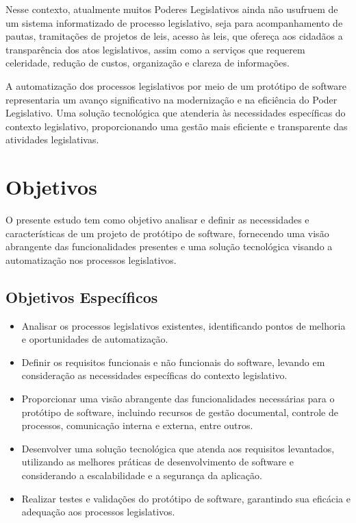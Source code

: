 \documentclass[12pt]{article}
\begin{document}
Nesse contexto, atualmente muitos Poderes Legislativos ainda não usufruem de um sistema informatizado de processo legislativo, seja para acompanhamento de pautas, tramitações de projetos de leis, acesso às leis, que ofereça aos cidadãos a transparência dos atos legislativos, assim como a serviços que requerem celeridade, redução de custos, organização e clareza de informações.

A automatização dos processos legislativos por meio de um protótipo de software representaria um avanço significativo na modernização e na eficiência do Poder Legislativo. Uma solução tecnológica que atenderia às necessidades específicas do contexto legislativo, proporcionando uma gestão mais eficiente e transparente das atividades legislativas.

\section{Objetivos}

O presente estudo tem como objetivo analisar e definir as necessidades e características de um projeto de protótipo de software, fornecendo uma visão abrangente das funcionalidades presentes e uma solução tecnológica visando a automatização nos processos legislativos. 

\subsection{Objetivos Específicos}

\begin{itemize}
	\item Analisar os processos legislativos existentes, identificando pontos de melhoria e oportunidades de automatização.
	
	\item Definir os requisitos funcionais e não funcionais do software, levando em consideração as necessidades específicas do contexto legislativo.
	
	\item Proporcionar uma visão abrangente das funcionalidades necessárias para o protótipo de software, incluindo recursos de gestão documental, controle de processos, comunicação interna e externa, entre outros.
	
	\item Desenvolver uma solução tecnológica que atenda aos requisitos levantados, utilizando as melhores práticas de desenvolvimento de software e considerando a escalabilidade e a segurança da aplicação.
	
	\item Realizar testes e validações do protótipo de software, garantindo sua eficácia e adequação aos processos legislativos.
\end{itemize}
\end{document}
